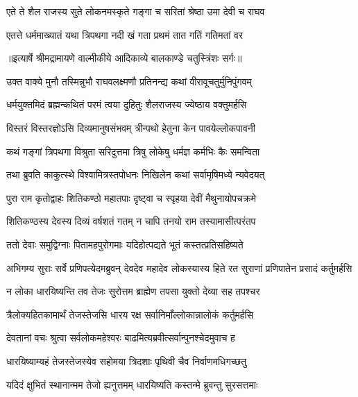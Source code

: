 \twolineshloka
{एते ते शैल राजस्य सुते लोकनमस्कृते}
{गङ्गा च सरितां श्रेष्ठा उमा देवी च राघव} %

\twolineshloka
{एतत्ते धर्ममाख्यातं यथा त्रिपथगा नदी}
{खं गता प्रथमं तात गतिं गतिमतां वर} %


{॥इत्यार्षे श्रीमद्रामायणे वाल्मीकीये आदिकाव्ये बालकाण्डे चतुस्त्रिंशः सर्गः॥}


\twolineshloka
{उक्त वाक्ये मुनौ तस्मिन्नुभौ राघवलक्ष्मणौ}
{प्रतिनन्द्य कथां वीरावूचतुर्मुनिपुंगवम्} %

\twolineshloka
{धर्मयुक्तमिदं ब्रह्मन्कथितं परमं त्वया}
{दुहितुः शैलराजस्य ज्येष्ठाय वक्तुमर्हसि} %

\twolineshloka
{विस्तरं विस्तरज्ञोऽसि दिव्यमानुषसंभवम्}
{त्रीन्पथो हेतुना केन पावयेल्लोकपावनी} %

\twolineshloka
{कथं गङ्गां त्रिपथगा विश्रुता सरिदुत्तमा}
{त्रिषु लोकेषु धर्मज्ञ कर्मभिः कैः समन्विता} %

\twolineshloka
{तथा ब्रुवति काकुत्स्थे विश्वामित्रस्तपोधनः}
{निखिलेन कथां सर्वामृषिमध्ये न्यवेदयत्} %

\twolineshloka
{पुरा राम कृतोद्वाहः शितिकण्ठो महातपाः}
{दृष्ट्वा च स्पृहया देवीं मैथुनायोपचक्रमे} %

\twolineshloka
{शितिकण्ठस्य देवस्य दिव्यं वर्षशतं गतम्}
{न चापि तनयो राम तस्यामासीत्परंतप} %

\twolineshloka
{ततो देवाः समुद्विग्नाः पितामहपुरोगमाः}
{यदिहोत्पद्यते भूतं कस्तत्प्रतिसहिष्यते} %

\threelineshloka
{अभिगम्य सुराः सर्वे प्रणिपत्येदमब्रुवन्}
{देवदेव महादेव लोकस्यास्य हिते रत}
{सुराणां प्रणिपातेन प्रसादं कर्तुमर्हसि} %

\twolineshloka
{न लोका धारयिष्यन्ति तव तेजः सुरोत्तम}
{ब्राह्मेण तपसा युक्तो देव्या सह तपश्चर} %

\twolineshloka
{त्रैलोक्यहितकामार्थं तेजस्तेजसि धारय}
{रक्ष सर्वानिमाँल्लोकान्नालोकं कर्तुमर्हसि} %

\twolineshloka
{देवतानां वचः श्रुत्वा सर्वलोकमहेश्वरः}
{बाढमित्यब्रवीत्सर्वान्पुनश्चेदमुवाच ह} %

\twolineshloka
{धारयिष्याम्यहं तेजस्तेजस्येव सहोमया}
{त्रिदशाः पृथिवी चैव निर्वाणमधिगच्छतु} %

\twolineshloka
{यदिदं क्षुभितं स्थानान्मम तेजो ह्यनुत्तमम्}
{धारयिष्यति कस्तन्मे ब्रुवन्तु सुरसत्तमाः} %

